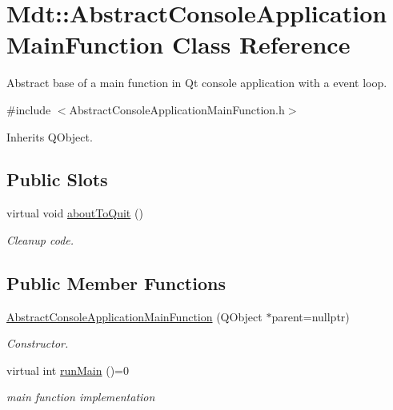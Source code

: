 \hypertarget{class_mdt_1_1_abstract_console_application_main_function}{}\section{Mdt\+:\+:Abstract\+Console\+Application\+Main\+Function Class Reference}
\label{class_mdt_1_1_abstract_console_application_main_function}


Abstract base of a main function in Qt console application with a event loop.  




{\ttfamily \#include $<$Abstract\+Console\+Application\+Main\+Function.\+h$>$}



Inherits Q\+Object.

\subsection*{Public Slots}
\begin{DoxyCompactItemize}
\item 
virtual void \hyperlink{class_mdt_1_1_abstract_console_application_main_function_a7f00b12d06e341d037cd1a69632b2ac2}{about\+To\+Quit} ()
\begin{DoxyCompactList}\small\item\em Cleanup code. \end{DoxyCompactList}\end{DoxyCompactItemize}
\subsection*{Public Member Functions}
\begin{DoxyCompactItemize}
\item 
\hyperlink{class_mdt_1_1_abstract_console_application_main_function_aec80aaecedd4a2d6696878b96cfc9b40}{Abstract\+Console\+Application\+Main\+Function} (Q\+Object $\ast$parent=nullptr)
\begin{DoxyCompactList}\small\item\em Constructor. \end{DoxyCompactList}\item 
virtual int \hyperlink{class_mdt_1_1_abstract_console_application_main_function_a34213b6ac2188b3620f5c2f5ce4ee287}{run\+Main} ()=0
\begin{DoxyCompactList}\small\item\em main function implementation \end{DoxyCompactList}\end{DoxyCompactItemize}
